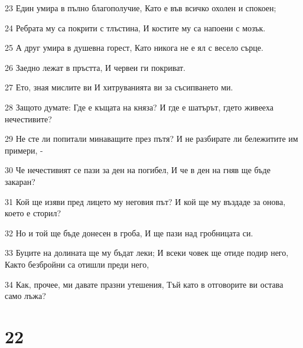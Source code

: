 \par 23 Един умира в пълно благополучие, Като е във всичко охолен и спокоен;
\par 24 Ребрата му са покрити с тлъстина, И костите му са напоени с мозък.
\par 25 А друг умира в душевна горест, Като никога не е ял с весело сърце.
\par 26 Заедно лежат в пръстта, И червеи ги покриват.
\par 27 Ето, зная мислите ви И хитруванията ви за съсипването ми.
\par 28 Защото думате: Где е къщата на княза? И где е шатърът, гдето живееха нечестивите?
\par 29 Не сте ли попитали минаващите през пътя? И не разбирате ли бележитите им примери, -
\par 30 Че нечестивият се пази за ден на погибел, И че в ден на гняв ще бъде закаран?
\par 31 Кой ще изяви пред лицето му неговия път? И кой ще му въздаде за онова, което е сторил?
\par 32 Но и той ще бъде донесен в гроба, И ще пази над гробницата си.
\par 33 Буците на долината ще му бъдат леки; И всеки човек ще отиде подир него, Както безбройни са отишли преди него,
\par 34 Как, прочее, ми давате празни утешения, Тъй като в отговорите ви остава само лъжа?

\chapter{22}

